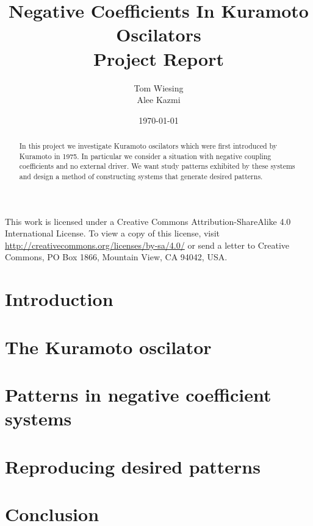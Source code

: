 \documentclass[12pt]{article}
\title{Negative Coefficients In Kuramoto Oscilators \\ Project Report}
\author{Tom Wiesing \\ Alee Kazmi}
\date{\today}
\begin{document}
	
	\maketitle
	
	
\begin{abstract}
	In this project we investigate Kuramoto oscilators which were first introduced by Kuramoto in 1975. In particular we consider a situation with negative coupling coefficients and no external driver. We want study patterns exhibited by these systems and design a method of constructing systems that generate desired patterns. 
\end{abstract}

	\newpage
	
	\tableofcontents
	
	
	\vspace{\fill}\noindent	This work is licensed under a Creative Commons Attribution-ShareAlike 4.0 International License. To view a copy of this license, visit \url{http://creativecommons.org/licenses/by-sa/4.0/} or send a letter to Creative Commons, PO Box 1866, Mountain View, CA 94042, USA. 
	\newpage
	
	\section{Introduction}
	
	\newpage
	
	\section{The Kuramoto oscilator}
	
	\newpage
	
	\section{Patterns in negative coefficient systems}
	
	\newpage
	
	\section{Reproducing desired patterns}
	
	\newpage
	
	\section{Conclusion}
	
	
	\printbibliography
\end{document}
